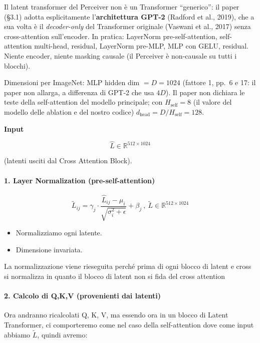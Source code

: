\documentclass[
  11pt,
]{article}
\begin{document}
\begin{notabox}[title={\textbf{Architettura GPT-2 nel latent transformer}}]
Il latent transformer del Perceiver non è un Transformer ``generico'': il paper (\S3.1) adotta esplicitamente l'\textbf{architettura GPT-2} (Radford et al., 2019), che a sua volta è il \emph{decoder-only} del Transformer originale (Vaswani et al., 2017) senza cross-attention sull'encoder. In pratica: LayerNorm pre-self-attention, self-attention multi-head, residual, LayerNorm pre-MLP, MLP con GELU, residual. Niente encoder, niente masking causale (il Perceiver è non-causale su tutti i blocchi).

Dimensioni per ImageNet: MLP hidden dim $= D = 1024$ (fattore 1, pp.~6 e 17: il paper non allarga, a differenza di GPT-2 che usa $4D$). Il paper non dichiara le teste della self-attention del modello principale; con $H_{\text{self}} = 8$ (il valore del modello delle ablation e del nostro codice) $d_{\text{head}} = D/H_{\text{self}} = 128$.
\end{notabox}

\textbf{Input}

\[\widehat{L} \in \mathbb{R}^{512 \times 1024}\]

(latenti usciti dal Cross Attention Block).

\paragraph{1. \textbf{Layer Normalization (pre-self-attention)}}

\[{\widetilde{L}}_{ij} = \gamma_{j} \cdot \frac{{\widehat{L}}_{ij} - \mu_{i}}{\sqrt{\sigma_{i}^{2} + \epsilon}} + \beta_{j}\ ,\ \widetilde{L} \in \mathbb{R}^{512 \times 1024}\]

\begin{itemize}
\item
  Normalizziamo ogni latente.
\item
  Dimensione invariata.
\end{itemize}

La normalizzazione viene rieseguita perché prima di ogni blocco di
latent e cross si normalizza in quanto il blocco di latent non si fida
del cross attention

\paragraph{2. \textbf{Calcolo di Q,K,V (provenienti dai latenti)}}

Ora andranno ricalcolati Q, K, V, ma essendo ora in un blocco di Latent
Transformer, ci comporteremo come nel caso della self-attention dove
come input abbiamo \(\widetilde{L}\), quindi avremo:
\end{document}
